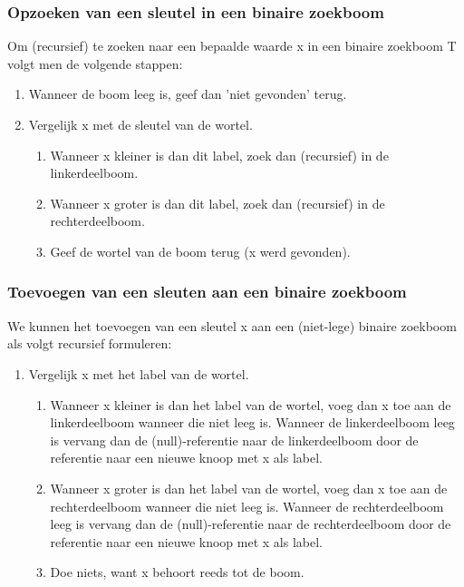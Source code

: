 \documentclass[a4paper,12pt]{article}
\begin{document}
\subsubsection{Opzoeken van een sleutel in een binaire zoekboom}
Om (recursief) te zoeken naar een bepaalde waarde x in een binaire zoekboom T volgt men de volgende stappen:

\begin{enumerate}
\item Wanneer de boom leeg is, geef dan ’niet gevonden’ terug.
\item Vergelijk x met de sleutel van de wortel.
	\begin{enumerate}
	\item Wanneer x kleiner is dan dit label, zoek dan (recursief) in de linkerdeelboom.
	\item Wanneer x groter is dan dit label, zoek dan (recursief) in de rechterdeelboom.
	\item Geef de wortel van de boom terug (x werd gevonden).
	\end{enumerate}
\end{enumerate}

\subsubsection{Toevoegen van een sleuten aan een binaire zoekboom}
We kunnen het toevoegen van een sleutel x aan een (niet-lege) binaire zoekboom als volgt recursief formuleren:
\begin{enumerate}
\item Vergelijk x met het label van de wortel.
	\begin{enumerate}
	\item Wanneer x kleiner is dan het label van de wortel, voeg dan x toe aan de linkerdeelboom wanneer die niet leeg is.
	Wanneer de linkerdeelboom leeg is vervang dan de (null)-referentie naar de linkerdeelboom door de referentie naar een nieuwe knoop met x als label.
	\item Wanneer x groter is dan het label van de wortel, voeg dan x toe aan de rechterdeelboom wanneer die niet leeg is.
	Wanneer de rechterdeelboom leeg is vervang dan de (null)-referentie naar de rechterdeelboom door de referentie naar een nieuwe knoop met x als label.
	\item Doe niets, want x behoort reeds tot de boom.
	\end{enumerate}
\end{enumerate}
\end{document}
